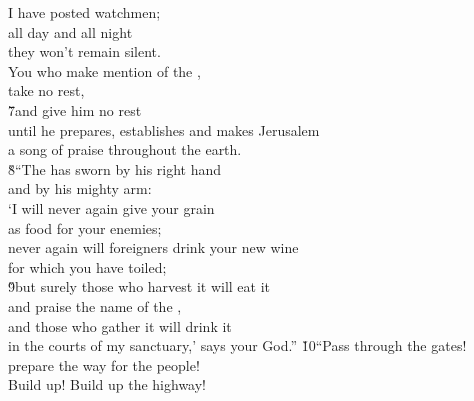 \begin{poetry}
\poemll    I have posted watchmen; \\
\poeml all day and all night \\
\poemll    they won't remain silent. \\
\poeml You who make mention of the , \\
\poemll    take no rest, \\
\poeml \v{7}and give him no rest \\
\poemll    until he prepares, establishes and makes Jerusalem \\
\poemlll       a song of praise throughout the earth. \\
\poeml \v{8}``The  has sworn by his right hand \\
\poemll    and by his mighty arm: \\
\poeml `I will never again give your grain \\
\poemll    as food for your enemies; \\
\poeml never again will foreigners drink your new wine \\
\poemll    for which you have toiled; \\
\poeml \v{9}but surely those who harvest it will eat it \\
\poemll    and praise the name of the , \\
\poeml and those who gather it will drink it \\
\poemll    in the courts of my sanctuary,' says your God.''
\poeml \v{10}``Pass through the gates! \\
\poemll    prepare the way for the people! \\
\poeml Build up! Build up the highway! \\

\end{poetry}
